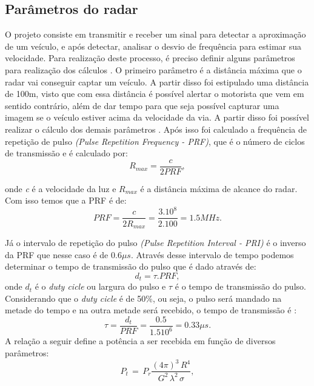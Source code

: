 \subsection{Parâmetros do radar}
O projeto consiste em transmitir e receber um sinal para detectar a aproximação de um veículo, e após detectar, analisar o desvio de frequência para estimar sua velocidade. Para realização deste processo, é preciso definir alguns parâmetros para realização dos cálculos \cite{richards}.
O primeiro parâmetro é a distância máxima que o radar vai conseguir captar um veículo. A partir disso foi estipulado uma distância de 100m, visto que com essa distância é possível alertar o motorista que vem em sentido contrário, além de dar tempo para que seja possível capturar uma imagem se o veículo estiver acima da velocidade da via. A partir disso foi possível realizar o cálculo dos demais parâmetros \cite{louis}.
Após isso foi calculado a frequência de repetição de pulso \emph{ (Pulse Repetition Frequency - PRF)}, que é o número de ciclos de transmissão e é calculado por:
\begin{equation}\label{R_MAX}
    R_{max} =  \frac{c}{2PRF},
\end{equation}

onde \emph{c} é a velocidade da luz e $R_{max}$ é a distância máxima de alcance do radar. Com isso temos que a PRF é de:
\begin{equation}\label{PRF}
  PRF =  \frac{c}{2R_{max}} = \frac{3.10^8}{2.100} = 1.5MHz.
\end{equation} \par
Já o intervalo de repetição do pulso \emph{(Pulse Repetition Interval - PRI)} é o inverso da PRF que nesse caso é de $0.6\mu s$. Através desse intervalo de tempo podemos determinar o tempo de transmissão do pulso que é dado através de: 
\begin{equation}\label{duty}
  d_t = \tau . PRF,
\end{equation}
onde $d_t$ é o \emph{duty cicle} ou largura do pulso e $\tau$ é o tempo de transmissão do pulso. Considerando que o \emph{duty cicle} é de 50$\%$, ou seja, o pulso será mandado na metade do tempo e na outra metade será recebido, o tempo de transmissão é  \cite{richards}:
\begin{equation}\label{tal}
  \tau = \frac{d_t}{PRF} =  \frac{0.5}{1.510^6} = 0.33\mu s.
\end{equation}
A relação a seguir define a potência a ser recebida em função de diversos parâmetros:
\begin{equation}\label{potencia_recebida}
    P_t\, =\,   P_r \frac{(4\pi)^{3}\,  R^{4}}{G^{2}\,   \lambda^{2}\, \sigma },
\end{equation}%

